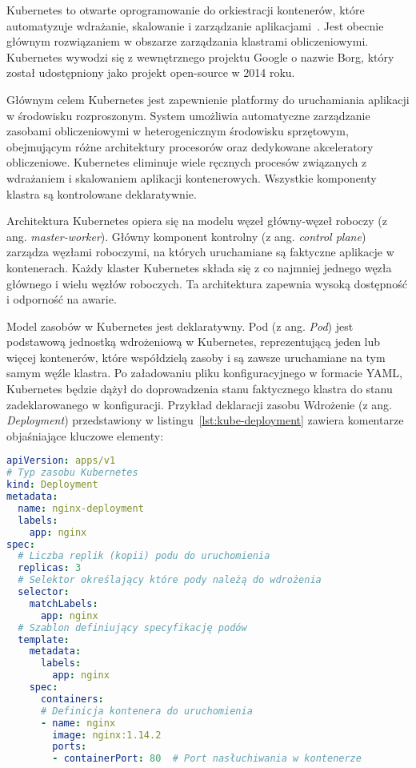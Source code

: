 Kubernetes to otwarte oprogramowanie do orkiestracji kontenerów, które automatyzuje wdrażanie, skalowanie i zarządzanie aplikacjami~\cite{kubernetes}.
Jest obecnie głównym rozwiązaniem w obszarze zarządzania klastrami obliczeniowymi.
Kubernetes wywodzi się z wewnętrznego projektu Google o nazwie Borg, który został udostępniony jako projekt open-source w 2014 roku.

Głównym celem Kubernetes jest zapewnienie platformy do uruchamiania aplikacji w środowisku rozproszonym.
System umożliwia automatyczne zarządzanie zasobami obliczeniowymi w heterogenicznym środowisku sprzętowym, obejmującym różne architektury procesorów oraz dedykowane akceleratory obliczeniowe.
Kubernetes eliminuje wiele ręcznych procesów związanych z wdrażaniem i skalowaniem aplikacji kontenerowych.
Wszystkie komponenty klastra są kontrolowane deklaratywnie.

Architektura Kubernetes opiera się na modelu węzeł główny-węzeł roboczy (z ang. \textit{master-worker}).
Główny komponent kontrolny (z ang. \textit{control plane}) zarządza węzłami roboczymi, na których uruchamiane są faktyczne aplikacje w kontenerach.
Każdy klaster Kubernetes składa się z co najmniej jednego węzła głównego i wielu węzłów roboczych.
Ta architektura zapewnia wysoką dostępność i odporność na awarie.

Model zasobów w Kubernetes jest deklaratywny.
Pod (z ang. \textit{Pod}) jest podstawową jednostką wdrożeniową w Kubernetes, reprezentującą jeden lub więcej kontenerów, które współdzielą zasoby i są zawsze uruchamiane na tym samym węźle klastra.
Po załadowaniu pliku konfiguracyjnego w formacie YAML, Kubernetes będzie dążył do doprowadzenia stanu faktycznego klastra do stanu zadeklarowanego w konfiguracji.
Przykład deklaracji zasobu Wdrożenie (z ang. \textit{Deployment}) przedstawiony w listingu~\ref{lst:kube-deployment} zawiera komentarze objaśniające kluczowe elementy:

\begin{lstlisting}[language=yaml,caption={Przykładowa deklaracja wdrożenia w Kubernetes},label={lst:kube-deployment}]
apiVersion: apps/v1
# Typ zasobu Kubernetes
kind: Deployment 
metadata:
  name: nginx-deployment
  labels:
    app: nginx
spec:
  # Liczba replik (kopii) podu do uruchomienia
  replicas: 3
  # Selektor określający które pody należą do wdrożenia
  selector:
    matchLabels:
      app: nginx
  # Szablon definiujący specyfikację podów
  template:
    metadata:
      labels:
        app: nginx
    spec:
      containers:
      # Definicja kontenera do uruchomienia
      - name: nginx
        image: nginx:1.14.2
        ports:
        - containerPort: 80  # Port nasłuchiwania w kontenerze
\end{lstlisting}

